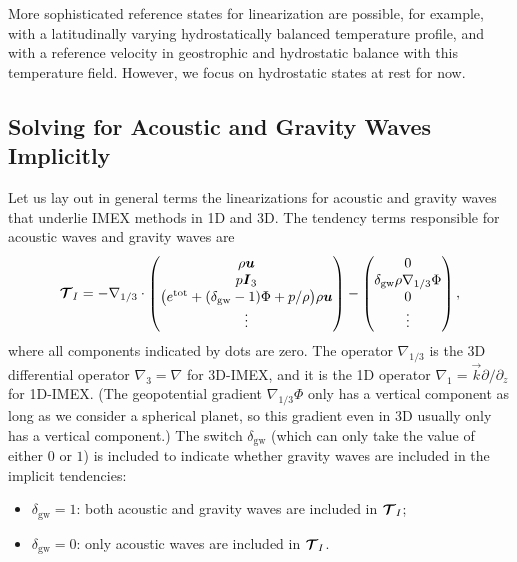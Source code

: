 \documentclass{report}
\begin{document}
More sophisticated reference states for linearization are possible, for example, with a latitudinally varying hydrostatically balanced temperature profile, and with a reference velocity in geostrophic and hydrostatic balance with this temperature field. However, we focus on hydrostatic states at rest for now. 
 
 \subsection{Solving for Acoustic and Gravity Waves Implicitly}
 \label{s:IMEX_general}

Let us lay out in general terms the linearizations for acoustic and gravity waves that underlie IMEX methods in 1D and 3D. The tendency terms responsible for acoustic waves and gravity waves are
 \begin{equation}
 \boldsymbol{{\mathcal{T}}}_{I}= -\nabla_{1/3} \cdot
 \begin{pmatrix}
 \rho \boldsymbol{{u}} \\
 p \boldsymbol{{I}}_3 \\
 \bigl(e^{\mathrm{tot}} + (\delta_{\mathrm{gw}}-1) \Phi + p/\rho \bigr) \rho \boldsymbol{{u}} \\
 \vdots
 \end{pmatrix}
 - \begin{pmatrix}
 0 \\
 \delta_{\mathrm{gw}} \rho \nabla_{1/3} \Phi \\
 0\\
 \vdots
 \end{pmatrix},
 \label{eq:3d-imex/tendencies}
 \end{equation}
where all components indicated by dots are zero. The operator $\nabla_{1/3}$ is the 3D differential operator $\nabla_3 = \nabla$ for 3D-IMEX, and it is the 1D operator $\nabla_1 = \vec{k} \partial/\partial_z$ for 1D-IMEX. (The geopotential gradient $\nabla_{1/3} \Phi$ only has a vertical component as long as we consider a spherical planet, so this gradient even in 3D usually only has a vertical component.) The switch $\delta_{\mathrm{gw}}$ (which can only take the value of either $0$ or $1$) is included to indicate whether gravity waves are included in the implicit tendencies: 
\begin{itemize}
    \item $\delta_{\mathrm{gw}}=1$: both acoustic and gravity waves are included in $\boldsymbol{{\mathcal{T}}}_I$;
    \item $\delta_{\mathrm{gw}}=0$: only acoustic waves are included in $\boldsymbol{{\mathcal{T}}}_I$.
\end{itemize}
\end{document}
